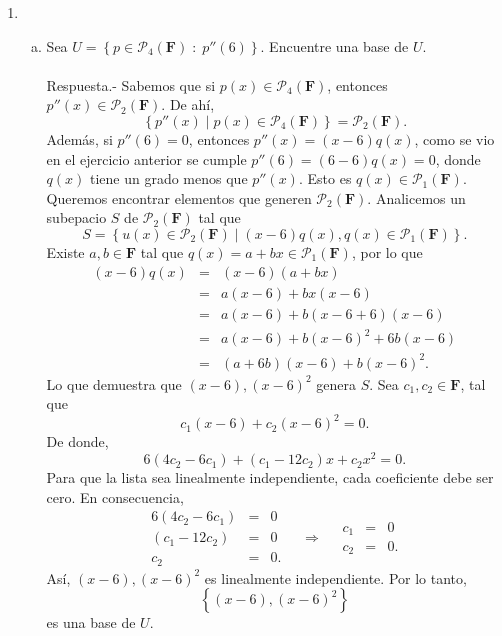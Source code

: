 \begin{enumerate}[\bfseries 1.]
\begin{enumerate}[(a)]
	\end{enumerate}

    \item 
	\begin{enumerate}[(a)]

	    \item Sea $U=\left\{p\in \mathcal{P}_4(\textbf{F})\; :\; p''(6)\right\}$. Encuentre una base de $U$.\\\\
		Respuesta.-\; Sabemos que si $p(x)\in \mathcal{P}_4(\textbf{F})$, entonces $p''(x)\in \mathcal{P}_2(\textbf{F})$. De ahí, 
		$$\left\{p''(x)\; |\; p(x)\in \mathcal{P}_4(\textbf{F})\right\}=\mathcal{P}_2(\textbf{F}).$$
		Además, si $p''(6)=0$, entonces $p''(x)=(x-6)q(x)$, como se vio en el ejercicio anterior se cumple $p''(6)=(6-6)q(x)=0$, donde $q(x)$ tiene un grado menos que $p''(x)$. Esto es $q(x)\in \mathcal{P}_1(\textbf{F})$.\\

		Queremos encontrar elementos que generen $\mathcal{P}_2(\textbf{F})$. Analicemos un subepacio $S$ de $\mathcal{P}_2(\textbf{F})$ tal que 
		$$S=\left\{u(x)\in \mathcal{P}_2(\textbf{F})\; |\; (x-6)q(x),q(x)\in \mathcal{P}_1(\textbf{F})\right\}.$$ 
		Existe $a,b\in \textbf{F}$ tal que $q(x)=a+bx\in \mathcal{P}_1(\textbf{F})$, por lo que
		$$
		\begin{array}{rcl}
		    (x-6)q(x) &=& (x-6)(a+bx)\\
			      &=& a(x-6)+bx(x-6)\\
			      &=& a(x-6)+b(x-6+6)(x-6)\\
			      &=& a(x-6)+b(x-6)^2+6b(x-6)\\
			      &=& (a+6b)(x-6)+b(x-6)^2.
		\end{array}
		$$
		Lo que demuestra que $(x-6),(x-6)^2$ genera $S$. Sea $c_1,c_2\in \textbf{F}$, tal que
		$$c_1(x-6)+c_2(x-6)^2=0.$$
		De donde,
		$$6(4c_2-6c_1)+(c_1-12c_2)x+c_2x^2=0.$$
		Para que la lista sea linealmente independiente, cada coeficiente debe ser cero. En consecuencia,
		$$
		\begin{array}{rcl}
		    6(4c_2-6c_1)&=&0\\
		    (c_1-12c_2)&=&0\\
		    c_2&=&0.
		\end{array}
		\quad \Rightarrow \quad
		\begin{array}{rcl}
		    c_1&=&0\\
		    c_2&=&0.
		\end{array}
		$$
		Así, $(x-6),(x-6)^2$ es linealmente independiente. Por lo tanto, 
		$$\left\{(x-6),(x-6)^2\right\}$$
		es una base de $U$.\\


\end{enumerate}
\end{enumerate}
